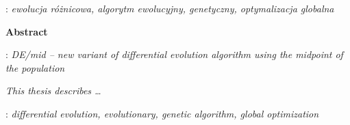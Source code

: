\begin{titlepage}
    : {\itshape ewolucja różnicowa, algorytm ewolucyjny, genetyczny, optymalizacja globalna}
    \par
    \vspace{4\baselineskip}
    \begin{center}
	{\large\bfseries Abstract}\par\bigskip
    \end{center}
    : {\itshape DE/mid -- new variant of differential evolution algorithm using the midpoint of the population}\par
    \vspace*{1\baselineskip}
    {\itshape
    This thesis describes \ldots}
    \vspace*{1\baselineskip}

    : {\itshape differential evolution, evolutionary, genetic algorithm, global optimization
}

\end{titlepage}
